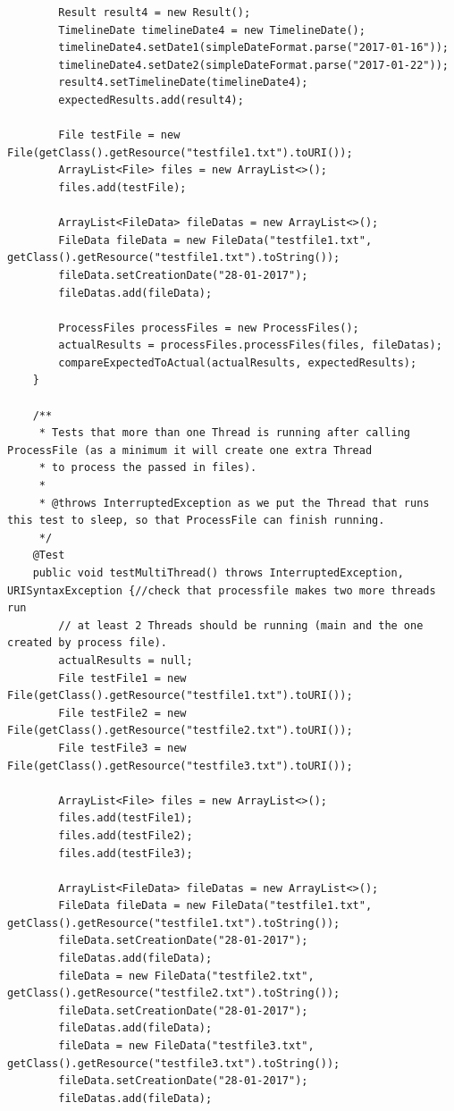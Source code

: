 \begin{lstlisting}
        Result result4 = new Result();
        TimelineDate timelineDate4 = new TimelineDate();
        timelineDate4.setDate1(simpleDateFormat.parse("2017-01-16"));
        timelineDate4.setDate2(simpleDateFormat.parse("2017-01-22"));
        result4.setTimelineDate(timelineDate4);
        expectedResults.add(result4);

        File testFile = new File(getClass().getResource("testfile1.txt").toURI());
        ArrayList<File> files = new ArrayList<>();
        files.add(testFile);

        ArrayList<FileData> fileDatas = new ArrayList<>();
        FileData fileData = new FileData("testfile1.txt", getClass().getResource("testfile1.txt").toString());
        fileData.setCreationDate("28-01-2017");
        fileDatas.add(fileData);

        ProcessFiles processFiles = new ProcessFiles();
        actualResults = processFiles.processFiles(files, fileDatas);
        compareExpectedToActual(actualResults, expectedResults);
    }

    /**
     * Tests that more than one Thread is running after calling ProcessFile (as a minimum it will create one extra Thread
     * to process the passed in files).
     *
     * @throws InterruptedException as we put the Thread that runs this test to sleep, so that ProcessFile can finish running.
     */
    @Test
    public void testMultiThread() throws InterruptedException, URISyntaxException {//check that processfile makes two more threads run
        // at least 2 Threads should be running (main and the one created by process file).
        actualResults = null;
        File testFile1 = new File(getClass().getResource("testfile1.txt").toURI());
        File testFile2 = new File(getClass().getResource("testfile2.txt").toURI());
        File testFile3 = new File(getClass().getResource("testfile3.txt").toURI());

        ArrayList<File> files = new ArrayList<>();
        files.add(testFile1);
        files.add(testFile2);
        files.add(testFile3);

        ArrayList<FileData> fileDatas = new ArrayList<>();
        FileData fileData = new FileData("testfile1.txt", getClass().getResource("testfile1.txt").toString());
        fileData.setCreationDate("28-01-2017");
        fileDatas.add(fileData);
        fileData = new FileData("testfile2.txt", getClass().getResource("testfile2.txt").toString());
        fileData.setCreationDate("28-01-2017");
        fileDatas.add(fileData);
        fileData = new FileData("testfile3.txt", getClass().getResource("testfile3.txt").toString());
        fileData.setCreationDate("28-01-2017");
        fileDatas.add(fileData);


\end{lstlisting}
